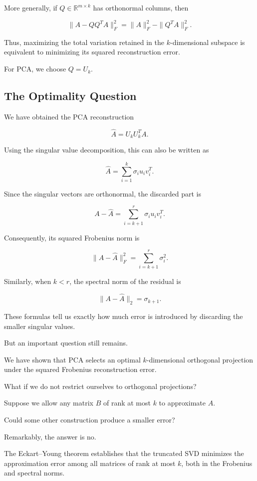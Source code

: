 \documentclass[11pt]{article}
\begin{document}
More generally, if
$Q\in\mathbb{R}^{m\times k}$
has orthonormal columns,
then

\[
\boxed{
\|A-QQ^TA\|_F^2
=
\|A\|_F^2-\|Q^TA\|_F^2.
}
\]

Thus, maximizing the total
variation retained in the
$k$-dimensional subspace
is equivalent to minimizing
its squared reconstruction
error.

For PCA, we choose $Q=U_k$.

\subsection{The Optimality Question}

We have obtained the PCA
reconstruction

\[
\widehat{A}=U_kU_k^TA.
\]

Using the singular value
decomposition, this can
also be written as

\[
\boxed{
\widehat{A}
=
\sum_{i=1}^{k}
\sigma_i u_i v_i^T.
}
\]

Since the singular vectors
are orthonormal, the
discarded part is

\[
A-\widehat{A}
=
\sum_{i=k+1}^{r}
\sigma_i u_i v_i^T.
\]

Consequently, its squared
Frobenius norm is

\[
\boxed{
\|A-\widehat{A}\|_F^2
=
\sum_{i=k+1}^{r}
\sigma_i^2.
}
\]

Similarly, when $k<r$,
the spectral norm of the
residual is

\[
\boxed{
\|A-\widehat{A}\|_2
=
\sigma_{k+1}.
}
\]

These formulas tell us
exactly how much error
is introduced by discarding
the smaller singular values.

But an important question
still remains.

We have shown that PCA
selects an optimal
$k$-dimensional orthogonal
projection under the squared
Frobenius reconstruction error.

What if we do not restrict
ourselves to orthogonal
projections?

Suppose we allow any
matrix $B$ of rank at most
$k$ to approximate $A$.

Could some other construction
produce a smaller error?

Remarkably, the answer is no.

The Eckart--Young theorem
establishes that the truncated
SVD minimizes the approximation
error among all matrices
of rank at most $k$,
both in the Frobenius
and spectral norms.
\end{document}
